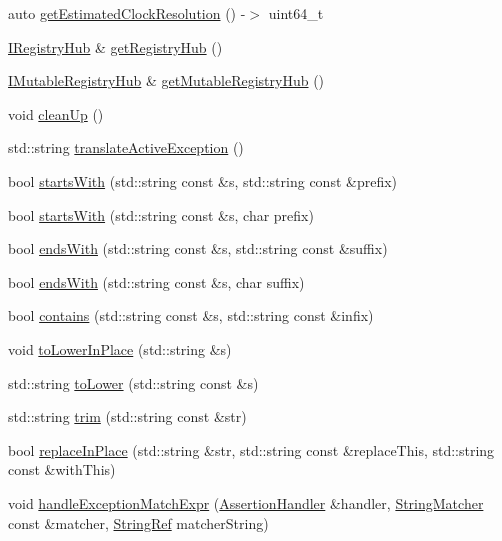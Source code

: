 \begin{DoxyCompactItemize}
auto \hyperlink{namespace_catch_ac8e1ed37624bd0d97b2c0d4ec099d31f}{get\-Estimated\-Clock\-Resolution} () -\/$>$ uint64\-\_\-t
\item 
\hyperlink{struct_catch_1_1_i_registry_hub}{I\-Registry\-Hub} \& \hyperlink{namespace_catch_ac24b072979540bfd922e7d46e899f46f}{get\-Registry\-Hub} ()
\item 
\hyperlink{struct_catch_1_1_i_mutable_registry_hub}{I\-Mutable\-Registry\-Hub} \& \hyperlink{namespace_catch_ac9ddcc6d66079add9cb2a3140b8ae51e}{get\-Mutable\-Registry\-Hub} ()
\item 
void \hyperlink{namespace_catch_a0f78e9afdebc6d4512d18e76fbf54b8c}{clean\-Up} ()
\item 
std\-::string \hyperlink{namespace_catch_adafff91485eeeeb9e9333f317cc0e3b1}{translate\-Active\-Exception} ()
\item 
bool \hyperlink{namespace_catch_a695f62327be0676e046291eeaae15110}{starts\-With} (std\-::string const \&s, std\-::string const \&prefix)
\item 
bool \hyperlink{namespace_catch_acad23751846ac23d0f379e34f5adebb1}{starts\-With} (std\-::string const \&s, char prefix)
\item 
bool \hyperlink{namespace_catch_ada025504f627feaf9ac68ca391515dff}{ends\-With} (std\-::string const \&s, std\-::string const \&suffix)
\item 
bool \hyperlink{namespace_catch_afd801a3e33fd7a8b91ded0d02747a93f}{ends\-With} (std\-::string const \&s, char suffix)
\item 
bool \hyperlink{namespace_catch_aa52974b0e426e7e2fbd725a900e9c36e}{contains} (std\-::string const \&s, std\-::string const \&infix)
\item 
void \hyperlink{namespace_catch_a0760dbe87d090a55a35414db57d272c4}{to\-Lower\-In\-Place} (std\-::string \&s)
\item 
std\-::string \hyperlink{namespace_catch_ac036a17412d318598ffda8e1fe7a1177}{to\-Lower} (std\-::string const \&s)
\item 
std\-::string \hyperlink{namespace_catch_a084108b47f37d8bfd5db51c50c7451b3}{trim} (std\-::string const \&str)
\item 
bool \hyperlink{namespace_catch_afe4e6770da547e43e9e4eeaa05f946ea}{replace\-In\-Place} (std\-::string \&str, std\-::string const \&replace\-This, std\-::string const \&with\-This)
\item 
void \hyperlink{namespace_catch_a59e375ed0dbd3d6e2f5a29c86c4d8042}{handle\-Exception\-Match\-Expr} (\hyperlink{class_catch_1_1_assertion_handler}{Assertion\-Handler} \&handler, \hyperlink{namespace_catch_aba438977e831821a2eeca82b9b4f4af2}{String\-Matcher} const \&matcher, \hyperlink{class_catch_1_1_string_ref}{String\-Ref} matcher\-String)

\end{DoxyCompactItemize}
